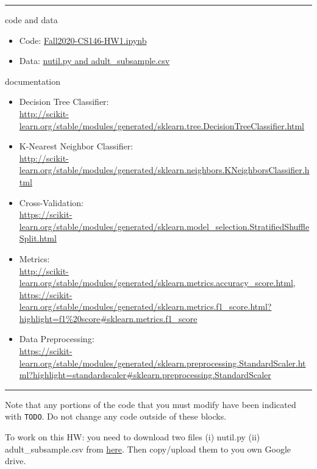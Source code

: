 \vspace{-\baselineskip}
\rule{\textwidth}{1pt}
code and data
\begin{itemize}[nolistsep]
\item Code: \href{https://colab.research.google.com/drive/1_O5QwkZ33fnYbW3zwSnKjeVYkeoEtIeD?usp=sharing}{Fall2020-CS146-HW1.ipynb}\item Data: \href{https://drive.google.com/drive/folders/1xjZlT1TzoJ79Hd48fdjI1-gk7hnNOwTz?usp=sharing}{nutil.py and adult\_subsample.csv} 


\end{itemize}
documentation
\begin{itemize}[nolistsep]
\item Decision Tree Classifier: \\{\footnotesize \url{http://scikit-learn.org/stable/modules/generated/sklearn.tree.DecisionTreeClassifier.html}}
\item K-Nearest Neighbor Classifier: \\{\footnotesize \url{http://scikit-learn.org/stable/modules/generated/sklearn.neighbors.KNeighborsClassifier.html}} 
\item Cross-Validation: \\{\footnotesize \url{https://scikit-learn.org/stable/modules/generated/sklearn.model_selection.StratifiedShuffleSplit.html}}
\item Metrics: \\ {\footnotesize \url{http://scikit-learn.org/stable/modules/generated/sklearn.metrics.accuracy_score.html}, \\
\url{https://scikit-learn.org/stable/modules/generated/sklearn.metrics.f1_score.html?highlight=f1%20score#sklearn.metrics.f1_score}} 
\item Data Preprocessing: \\{\footnotesize \url{https://scikit-learn.org/stable/modules/generated/sklearn.preprocessing.StandardScaler.html?highlight=standardscaler#sklearn.preprocessing.StandardScaler}}
\end{itemize}
\vspace{-\baselineskip}
\rule{\textwidth}{1pt}


Note that any portions of the code that you must modify have been indicated with \verb|TODO|. Do not change any code outside of these blocks.
\fi

To work on this HW: you need to download two files (i) nutil.py (ii) adult\_subsample.csv from  \href{https://drive.google.com/drive/folders/1xjZlT1TzoJ79Hd48fdjI1-gk7hnNOwTz?usp=sharing}{here}. Then copy/upload them to you own Google drive. 

